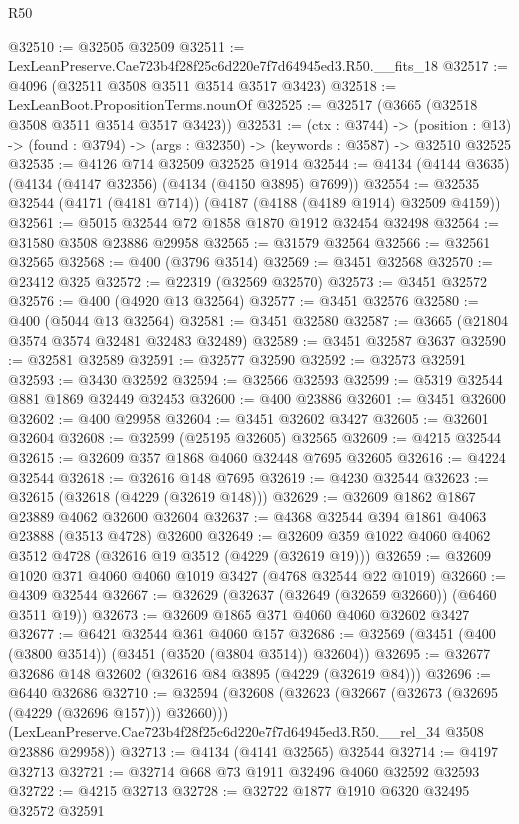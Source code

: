 \begin{lexlean}{R50}
\begin{coremodule}
@32510 := @32505 @32509
@32511 := LexLeanPreserve.Cae723b4f28f25c6d220e7f7d64945ed3.R50.__fits_18
@32517 := @4096 (@32511 @3508 @3511 @3514 @3517 @3423)
@32518 := LexLeanBoot.PropositionTerms.nounOf
@32525 := @32517 (@3665 (@32518 @3508 @3511 @3514 @3517 @3423))
@32531 := (ctx : @3744) ->
  (position : @13) -> (found : @3794) -> (args : @32350) -> (keywords : @3587) -> @32510 @32525
@32535 := @4126 @714 @32509 @32525 @1914
@32544 := @4134 (@4144 @3635) (@4134 (@4147 @32356) (@4134 (@4150 @3895) @7699))
@32554 := @32535 @32544 (@4171 (@4181 @714)) (@4187 (@4188 (@4189 @1914) @32509 @4159))
@32561 := @5015 @32544 @72 @1858 @1870 @1912 @32454 @32498
@32564 := @31580 @3508 @23886 @29958
@32565 := @31579 @32564
@32566 := @32561 @32565
@32568 := @400 (@3796 @3514)
@32569 := @3451 @32568
@32570 := @23412 @325
@32572 := @22319 (@32569 @32570)
@32573 := @3451 @32572
@32576 := @400 (@4920 @13 @32564)
@32577 := @3451 @32576
@32580 := @400 (@5044 @13 @32564)
@32581 := @3451 @32580
@32587 := @3665 (@21804 @3574 @3574 @32481 @32483 @32489)
@32589 := @3451 @32587 @3637
@32590 := @32581 @32589
@32591 := @32577 @32590
@32592 := @32573 @32591
@32593 := @3430 @32592
@32594 := @32566 @32593
@32599 := @5319 @32544 @881 @1869 @32449 @32453
@32600 := @400 @23886
@32601 := @3451 @32600
@32602 := @400 @29958
@32604 := @3451 @32602 @3427
@32605 := @32601 @32604
@32608 := @32599 (@25195 @32605) @32565
@32609 := @4215 @32544
@32615 := @32609 @357 @1868 @4060 @32448 @7695 @32605
@32616 := @4224 @32544
@32618 := @32616 @148 @7695
@32619 := @4230 @32544
@32623 := @32615 (@32618 (@4229 (@32619 @148)))
@32629 := @32609 @1862 @1867 @23889 @4062 @32600 @32604
@32637 := @4368 @32544 @394 @1861 @4063 @23888 (@3513 @4728) @32600
@32649 := @32609 @359 @1022 @4060 @4062 @3512 @4728 (@32616 @19 @3512 (@4229 (@32619 @19)))
@32659 := @32609 @1020 @371 @4060 @4060 @1019 @3427 (@4768 @32544 @22 @1019)
@32660 := @4309 @32544
@32667 := @32629 (@32637 (@32649 (@32659 @32660)) (@6460 @3511 @19))
@32673 := @32609 @1865 @371 @4060 @4060 @32602 @3427
@32677 := @6421 @32544 @361 @4060 @157
@32686 := @32569 (@3451 (@400 (@3800 @3514)) (@3451 (@3520 (@3804 @3514)) @32604))
@32695 := @32677 @32686 @148 @32602 (@32616 @84 @3895 (@4229 (@32619 @84)))
@32696 := @6440 @32686
@32710 := @32594
    (@32608
      (@32623 (@32667 (@32673 (@32695 (@4229 (@32696 @157))) @32660)))
      (LexLeanPreserve.Cae723b4f28f25c6d220e7f7d64945ed3.R50.__rel_34 @3508 @23886 @29958))
@32713 := @4134 (@4141 @32565) @32544
@32714 := @4197 @32713
@32721 := @32714 @668 @73 @1911 @32496 @4060 @32592 @32593
@32722 := @4215 @32713
@32728 := @32722 @1877 @1910 @6320 @32495 @32572 @32591

\end{coremodule}
\end{lexlean}

